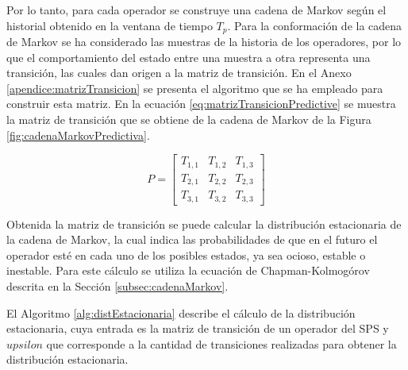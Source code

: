 
Por lo tanto, para cada operador se construye una cadena de Markov según el historial obtenido en la ventana de tiempo $T_p$. Para la conformación de la cadena de Markov se ha considerado las muestras de la historia de los operadores, por lo que el comportamiento del estado entre una muestra a otra representa una transición, las cuales dan origen a la matriz de transición. En el Anexo \ref{apendice:matrizTransicion} se presenta el algoritmo que se ha empleado para construir esta matriz. En la ecuación \ref{eq:matrizTransicionPredictive} se muestra la matriz de transición que se obtiene de la cadena de Markov de la Figura \ref{fig:cadenaMarkovPredictiva}.

\begin{equation} \label{eq:matrizTransicionPredictive}
	P =
	\begin{bmatrix}
		T_{1,1} & T_{1,2} & T_{1,3} \\
		T_{2,1} & T_{2,2} & T_{2,3} \\
		T_{3,1} & T_{3,2} & T_{3,3}
	\end{bmatrix}	
\end{equation}

Obtenida la matriz de transición se puede calcular la distribución estacionaria de la cadena de Markov, la cual indica las probabilidades de que en el futuro el operador esté en cada uno de los posibles estados, ya sea ocioso, estable o inestable. Para este cálculo se utiliza la ecuación de Chapman-Kolmogórov \citep{Papoulis1984} descrita en la Sección \ref{subsec:cadenaMarkov}.

El Algoritmo \ref{alg:distEstacionaria} describe el cálculo de la distribución estacionaria, cuya entrada es la matriz de transición de un operador del SPS y $upsilon$ que corresponde a la cantidad de transiciones realizadas para obtener la distribución estacionaria. 

